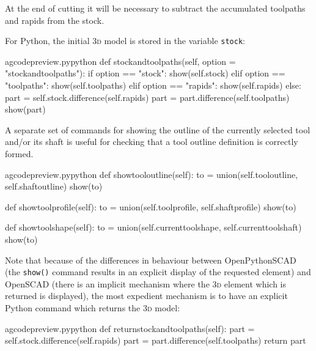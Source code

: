 \documentclass{ltxdoc}
\begin{document}
At the end of cutting it will be necessary to subtract the accumulated toolpaths and rapids from the stock. %

For Python, the initial \textsc{3d} model is stored in the variable \verb|stock|:

\lstset{firstnumber=\thegcpy}
\begin{writecode}{a}{gcodepreview.py}{python}
    def stockandtoolpaths(self, option = "stockandtoolpaths"):
        if option == "stock":
            show(self.stock)
        elif option == "toolpaths":
            show(self.toolpaths)
        elif option == "rapids":
            show(self.rapids)
        else:
            part = self.stock.difference(self.rapids)
            part = part.difference(self.toolpaths)
            show(part)

\end{writecode}
\addtocounter{gcpy}{12}

A separate set of commands for showing the outline of the currently selected tool and/or its shaft is useful for checking that a tool outline definition is correctly formed.

\lstset{firstnumber=\thegcpy}
\begin{writecode}{a}{gcodepreview.py}{python}
    def showtooloutline(self):
        to = union(self.tooloutline, self.shaftoutline)
        show(to)

    def showtoolprofile(self):
        to = union(self.toolprofile, self.shaftprofile)
        show(to)

    def showtoolshape(self):
        to = union(self.currenttoolshape, self.currenttoolshaft)
        show(to)

\end{writecode}
\addtocounter{gcpy}{12}

\noindent Note that because of the differences in behaviour between OpenPythonSCAD (the \verb|show()| command results in an explicit display of the requested element) and OpenSCAD (there is an implicit mechanism where the \textsc{3d} element which is returned is displayed), the most expedient mechanism is to have an explicit Python command which returns the \textsc{3d} model:

\lstset{firstnumber=\thegcpy}
\begin{writecode}{a}{gcodepreview.py}{python}
    def returnstockandtoolpaths(self):
        part = self.stock.difference(self.rapids)
        part = part.difference(self.toolpaths)
        return part

\end{writecode}
\addtocounter{gcpy}{5}
\end{document}
